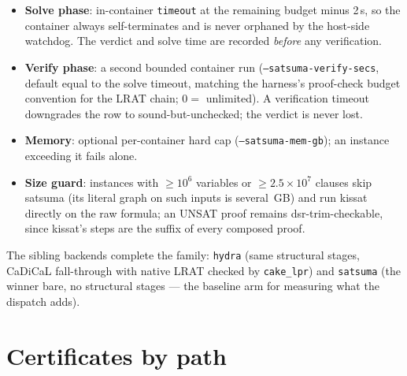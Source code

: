 \documentclass[10pt]{article}
\begin{document}
\begin{itemize}
\item \textbf{Solve phase}: in-container \texttt{timeout} at the
  remaining budget minus 2\,s, so the container always self-terminates
  and is never orphaned by the host-side watchdog. The verdict and
  solve time are recorded \emph{before} any verification.
\item \textbf{Verify phase}: a second bounded container run
  (\texttt{--satsuma-verify-secs}, default equal to the solve timeout,
  matching the harness's proof-check budget convention for the LRAT
  chain; $0=$ unlimited). A verification timeout downgrades the row to
  sound-but-unchecked; the verdict is never lost.
\item \textbf{Memory}: optional per-container hard cap
  (\texttt{--satsuma-mem-gb}); an instance exceeding it fails alone.
\item \textbf{Size guard}: instances with $\geq 10^6$ variables or
  $\geq 2.5\times 10^7$ clauses skip satsuma (its literal graph on
  such inputs is several~GB) and run kissat directly on the raw
  formula; an UNSAT proof remains dsr-trim-checkable, since kissat's
  steps are the suffix of every composed proof.
\end{itemize}

The sibling backends complete the family: \texttt{hydra} (same
structural stages, CaDiCaL fall-through with native LRAT checked by
\texttt{cake\_lpr}) and \texttt{satsuma} (the winner bare, no
structural stages --- the baseline arm for measuring what the
dispatch adds).

\section{Certificates by path}
\label{sec:certs}
\end{document}
